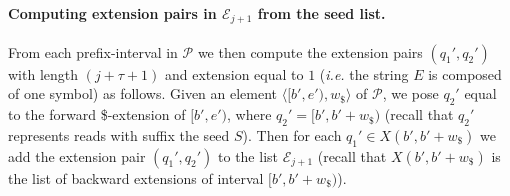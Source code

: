 \documentclass[runningheads,envcountsame,a4paper]{llncs}
\newcommand{\notaestesa}[2]{%
 \marginpar{\color{red!75!black}\textbf{\texttimes}}%
 {\color{red!75!black}%
 [\,\textbullet\,\textsf{\textbf{#1:}} %
 \textsf{\footnotesize#2}\,\textbullet\,]}%
}
\newcommand{\ie}{\textit{i.e.}\xspace}
\begin{document}
\begin{comment}
\notaestesa{RR}{Aggiungere tutti i riferimenti allo pseudocodice dopo averlo sistemato}

\paragraph{Computing the {\em seed-list}.}
Each element of the list $\mathcal{P}$ is made of a  \emph{prefix-interval} $[b',e')$
and its \$-width $w_\$ $ (recall that $w_\$ $ is  the number of     \$ backward \$-extension of  the $Q$-interval $[b,e)$ that is linked to $[b',e')$).
The list $\mathcal{P}$ is actually stored as a file and is sorted by ascending value of the starting
value $b'$ (\ie lexicographical order of $rev(Q)$). \notaestesa{RR}{Citare il classico problema di ordinamento in memoria esterna con la relativa citazione}.
Notice that the only operations allowed on that file are appending an item to
the end and popping (\ie reading from the head and deleting) an item.

\end{comment}

\paragraph{Computing  extension pairs in $\mathcal{E}_{j+1}$ from the seed list.}


From each  prefix-interval in $\mathcal{P}$ we then compute the extension pairs $(q_{1}', q_{2}')$ with
length $(j+\tau+1)$ and extension equal to $1$ (\ie the string $E$ is composed of one symbol) as follows.
Given an element  $\langle [b',e'), w_\$ \rangle$ of $\mathcal{P}$,
we pose $q_{2}'$ equal to the forward \$-extension of  $[b',e')$, where   $q_{2}' = [b',b'+w_\$)$
(recall that $q_{2}'$ represents reads with suffix the seed $S$).
%
Then
for each $q_{1}'\in X(b',b'+w_\$)$ we add the extension pair  $(q_{1}',q_{2}')$ to
the list $\mathcal{E}_{j+1}$ (recall that $ X(b',b'+w_\$)$ is the list of backward extensions of interval $[b',b'+w_\$)$).
\end{document}

